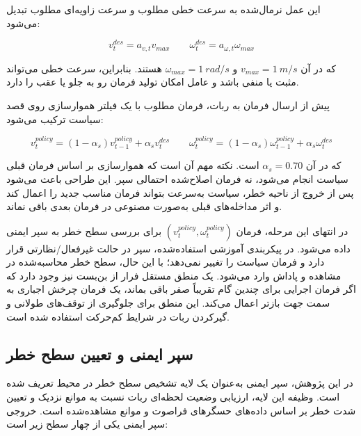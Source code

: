 این عمل نرمال‌شده به سرعت خطی مطلوب و سرعت زاویه‌ای مطلوب تبدیل می‌شود:

\begin{equation}
	v^{des}_t = a_{v,t} v_{max}
	\qquad
	\omega^{des}_t = a_{\omega,t} \omega_{max}
	\label{eq:action_scaling_final}
\end{equation}

که در آن \(v_{max}=1~m/s\) و \(\omega_{max}=1~rad/s\) هستند. بنابراین، سرعت خطی می‌تواند مثبت یا منفی باشد و عامل امکان تولید فرمان رو به جلو یا عقب را دارد.

پیش از ارسال فرمان به ربات، فرمان مطلوب با یک فیلتر هموارسازی روی قصد سیاست ترکیب می‌شود:

\begin{equation}
	v^{policy}_t = (1-\alpha_s)v^{policy}_{t-1} + \alpha_s v^{des}_t
	\qquad
	\omega^{policy}_t = (1-\alpha_s)\omega^{policy}_{t-1} + \alpha_s \omega^{des}_t
	\label{eq:policy_command_smoothing_final}
\end{equation}

که در آن \(\alpha_s=0.70\) است. نکته مهم آن است که هموارسازی بر اساس فرمان قبلی سیاست انجام می‌شود، نه فرمان اصلاح‌شده احتمالی سپر. این طراحی باعث می‌شود پس از خروج از ناحیه خطر، سیاست به‌سرعت بتواند فرمان مناسب جدید را اعمال کند و اثر مداخله‌های قبلی به‌صورت مصنوعی در فرمان بعدی باقی نماند.

در انتهای این مرحله، فرمان \((v^{policy}_t,\omega^{policy}_t)\) برای بررسی سطح خطر به سپر ایمنی داده می‌شود. در پیکربندی آموزشی استفاده‌شده، سپر در حالت غیرفعال/نظارتی قرار دارد و فرمان سیاست را تغییر نمی‌دهد؛ با این حال، سطح خطر محاسبه‌شده در مشاهده و پاداش وارد می‌شود. یک منطق مستقل فرار از بن‌بست نیز وجود دارد که اگر فرمان اجرایی برای چندین گام تقریباً صفر باقی بماند، یک فرمان چرخش اجباری به سمت جهت بازتر اعمال می‌کند. این منطق برای جلوگیری از توقف‌های طولانی و گیرکردن ربات در شرایط کم‌حرکت استفاده شده است.

\subsection{سپر ایمنی و تعیین سطح خطر}
\label{subsec:safety_shield_levels_final}

در این پژوهش، سپر ایمنی به‌عنوان یک لایه تشخیص سطح خطر در محیط تعریف شده است. وظیفه این لایه، ارزیابی وضعیت لحظه‌ای ربات نسبت به موانع نزدیک و تعیین شدت خطر بر اساس داده‌های حسگرهای فراصوت و موانع مشاهده‌شده است. خروجی سپر ایمنی یکی از چهار سطح زیر است:

